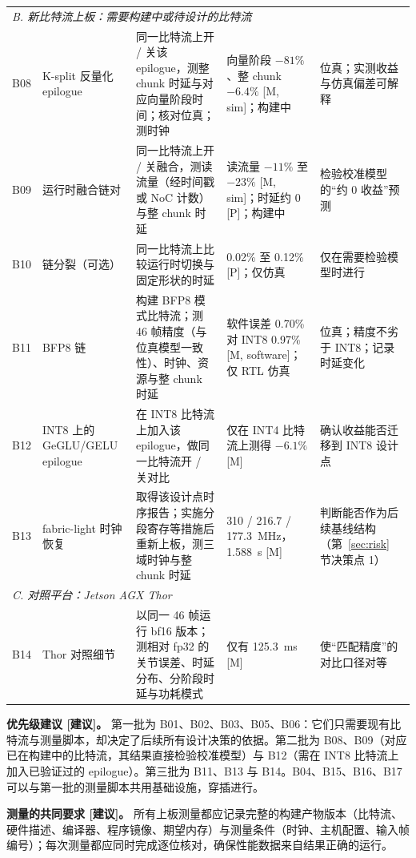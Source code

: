 \documentclass[a4paper,10.5pt]{ctexart}
\newcommand{\tM}{\textsf{[M]}}              %
\newcommand{\tP}{\textsf{[P]}}              %
\newcommand{\tMsim}{\textsf{[M, sim]}}      %
\newcommand{\tMsw}{\textsf{[M, software]}}  %
\newcommand{\tR}{\textsf{[建议]}}           %
\begin{document}
\begin{small}
\begin{longtable}{p{0.8cm} p{2.6cm} p{4.3cm} p{3.3cm} p{2.4cm}}
\multicolumn{5}{l}{\textit{B. 新比特流上板：需要构建中或待设计的比特流}} \\
B08 & K-split 反量化 epilogue & 同一比特流上开 / 关该 epilogue，测整 chunk 时延与对应向量阶段时间；核对位真；测时钟 & 向量阶段 $-81\%$、整 chunk $-6.4\%$ \tMsim；构建中 & 位真；实测收益与仿真偏差可解释 \\
B09 & 运行时融合链对 & 同一比特流上开 / 关融合，测读流量（经时间戳或 NoC 计数）与整 chunk 时延 & 读流量 $-11\%$ 至 $-23\%$ \tMsim；时延约 0 \tP；构建中 & 检验校准模型的“约 0 收益”预测 \\
B10 & 链分裂（可选） & 同一比特流上比较运行时切换与固定形状的时延 & 0.02\% 至 0.12\% \tP；仅仿真 & 仅在需要检验模型时进行 \\
B11 & BFP8 链 & 构建 BFP8 模式比特流；测 46 帧精度（与位真模型一致性）、时钟、资源与整 chunk 时延 & 软件误差 0.70\% 对 INT8 0.97\% \tMsw；仅 RTL 仿真 & 位真；精度不劣于 INT8；记录时延变化 \\
B12 & INT8 上的 GeGLU/GELU epilogue & 在 INT8 比特流上加入该 epilogue，做同一比特流开 / 关对比 & 仅在 INT4 比特流上测得 $-6.1\%$ \tM & 确认收益能否迁移到 INT8 设计点 \\
B13 & fabric-light 时钟恢复 & 取得该设计点时序报告；实施分段寄存等措施后重新上板，测三域时钟与整 chunk 时延 & 310 / 216.7 / 177.3~MHz，1.588~s \tM & 判断能否作为后续基线结构（第~\ref{sec:risk} 节决策点 1） \\
\multicolumn{5}{l}{\textit{C. 对照平台：Jetson AGX Thor}} \\
B14 & Thor 对照细节 & 以同一 46 帧运行 bf16 版本；测相对 fp32 的关节误差、时延分布、分阶段时延与功耗模式 & 仅有 125.3~ms \tM & 使“匹配精度”的对比口径对等 \\
\end{longtable}
\end{small}

\textbf{优先级建议 \tR。} 第一批为 B01、B02、B03、B05、B06：它们只需要现有比特流与测量脚本，却决定了后续所有设计决策的依据。第二批为 B08、B09（对应已在构建中的比特流，其结果直接检验校准模型）与 B12（需在 INT8 比特流上加入已验证过的 epilogue）。第三批为 B11、B13 与 B14。B04、B15、B16、B17 可以与第一批的测量脚本共用基础设施，穿插进行。

\textbf{测量的共同要求 \tR。} 所有上板测量都应记录完整的构建产物版本（比特流、硬件描述、编译器、程序镜像、期望内存）与测量条件（时钟、主机配置、输入帧编号）；每次测量都应同时完成逐位核对，确保性能数据来自结果正确的运行。



\end{document}
